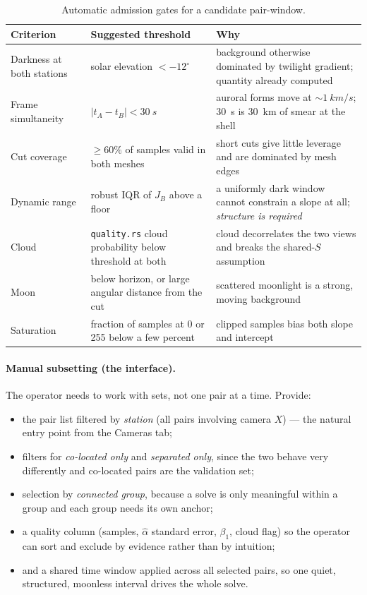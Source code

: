 \documentclass[11pt,a4paper]{article}
\begin{document}
\begin{table}[h]
\centering
\small
\begin{tabular}{p{}p{}p{}}
\toprule
Criterion & Suggested threshold & Why \\
\midrule
Darkness at both stations & solar elevation $<-12^\circ$ & background otherwise
dominated by twilight gradient; quantity already computed \\
Frame simultaneity & $|t_A-t_B|<\SI{30}{s}$ & auroral forms move at
$\sim\!\SI{1}{km/s}$; \SI{30}{s} is \SI{30}{km} of smear at the shell \\
Cut coverage & $\geq 60\%$ of samples valid in both meshes & short cuts give
little leverage and are dominated by mesh edges \\
Dynamic range & robust IQR of $J_B$ above a floor & a uniformly dark window
cannot constrain a slope at all; \emph{structure is required} \\
Cloud & \texttt{quality.rs} cloud probability below threshold at both & cloud
decorrelates the two views and breaks the shared-$S$ assumption \\
Moon & below horizon, or large angular distance from the cut & scattered
moonlight is a strong, moving background \\
Saturation & fraction of samples at 0 or 255 below a few percent & clipped
samples bias both slope and intercept \\
\bottomrule
\end{tabular}
\caption{Automatic admission gates for a candidate pair-window.}
\label{tab:gates}
\end{table}

\paragraph{Manual subsetting (the interface).} The operator needs to work with
sets, not one pair at a time. Provide:
\begin{itemize}
  \item the pair list filtered by \emph{station} (all pairs involving camera
    $X$) --- the natural entry point from the Cameras tab;
  \item filters for \emph{co-located only} and \emph{separated only}, since the
    two behave very differently and co-located pairs are the validation set;
  \item selection by \emph{connected group}, because a solve is only meaningful
    within a group and each group needs its own anchor;
  \item a quality column (samples, $\hat\alpha$ standard error, $\beta_1$,
    cloud flag) so the operator can sort and exclude by evidence rather than by
    intuition;
  \item and a shared time window applied across all selected pairs, so one
    quiet, structured, moonless interval drives the whole solve.
\end{itemize}
\end{document}
